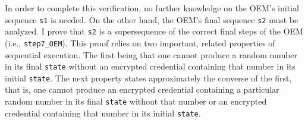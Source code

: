 In order to complete this verification, no further knowledge on the OEM's initial sequence \verb|s1| is needed.
On the other hand, the OEM's final sequence \verb|s2| must be analyzed.
I prove that \verb|s2| is a supersequence of the correct final steps of the OEM (i.e., \verb|step7_OEM|). This proof relies on two important, related properties of sequential execution. The first being that one cannot produce a random number in its final \verb|state| without an encrypted credential containing that number in its initial \verb|state|. The next property states approximately the converse of the first, that is, one cannot produce an encrypted credential containing a particular random number in its final \verb|state| without that number or an encrypted credential containing that number in its initial \verb|state|.







